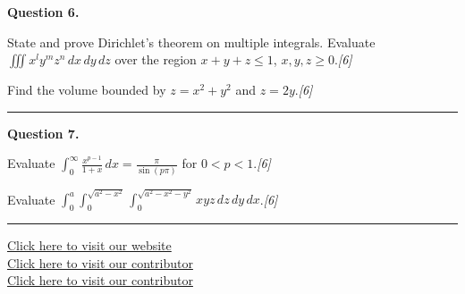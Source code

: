 \documentclass[11pt,a4paper]{article}
\newcommand{\pts}[1]{\hfill   \textit{[#1]}}
\begin{document}
\noindent   \textbf{Question 6.}

\begin{parts}
  \item State and prove Dirichlet's theorem on multiple integrals. Evaluate $\displaystyle\iiint x^l y^m z^n\,dx\,dy\,dz$ over the region $x+y+z\leq1$, $x,y,z\geq0$.\pts{6}
  \item Find the volume bounded by $z=x^2+y^2$ and $z=2y$.\pts{6}
\end{parts}
\medskip\rule{\linewidth}{0.2pt}

\medskip


\noindent   \textbf{Question 7.}

\begin{parts}
  \item Evaluate $\displaystyle\int_0^{\infty}\frac{x^{p-1}}{1+x}\,dx=\frac{\pi}{\sin(p\pi)}$ for $0<p<1$.\pts{6}
  \item Evaluate $\displaystyle\int_0^a\int_0^{\sqrt{a^2-x^2}}\!\!\int_0^{\sqrt{a^2-x^2-y^2}}xyz\,dz\,dy\,dx$.\pts{6}
\end{parts}

\vfill\rule{\linewidth}{0.4pt}

\begin{center}\small
\href{https://bhu-exam.vercel.app/}{Click here to visit our website}\\[4pt]
\href{https://me-aryan.vercel.app/}{Click here to visit our contributor}\\[4pt]
\href{https://quashan-me.vercel.app/}{Click here to visit our contributor}
\end{center}
\end{document}
